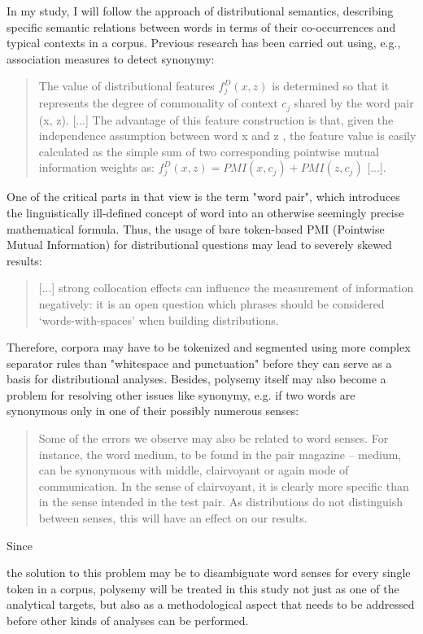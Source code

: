 \documentclass[jou]{apa6} %
\begin{document}
In my study, I will follow the approach of distributional semantics, describing specific semantic relations between words in terms of their co-occurrences and typical contexts in a corpus. Previous research has been carried out using, e.g., association measures to detect synonymy:
\blockquote[{\cite[p.~566]{hagiwaraSupervisedSynonymAcquisition2009}}]{The value of distributional features \( f_j^D (x, z) \) is determined so that it represents the degree of commonality of context \( c_j \) shared by the word pair (x, z). [...] The advantage of this feature construction is that, given the independence assumption between word x and z , the feature value is easily calculated as the simple sum of two corresponding pointwise mutual information weights as: \( f_j^D (x, z) = PMI(x, c_j) + PMI(z, c_j) \) [...].}
One of the critical parts in that view is the term "word pair", which introduces the linguistically ill-defined concept of word into an otherwise seemingly precise mathematical formula. Thus, the usage of bare token-based PMI (Pointwise Mutual Information) for distributional questions may lead to severely skewed results:
\blockquote[{\cite[p.~444]{herbelotMeasuringSemanticContent2013}}]{[...] strong collocation effects can influence the measurement of information negatively: it is an open question which phrases should be considered ‘words-with-spaces’ when building distributions.}
Therefore, corpora may have to be tokenized and segmented using more complex separator rules than "whitespace and punctuation" before they can serve as a basis for distributional analyses. Besides, polysemy itself may also become a problem for resolving other issues like synonymy, e.g. if two words are synonymous only in one of their possibly numerous senses:
\blockquote[{\cite[p.~444]{herbelotMeasuringSemanticContent2013}}]{Some of the errors we observe may also be related to word senses. For instance, the word medium, to be found in the pair magazine – medium, can be synonymous with middle, clairvoyant or again mode of communication. In the sense of clairvoyant, it is clearly more specific than in the sense intended in the test pair. As distributions do not distinguish between senses, this will have an effect on our results.}
\hypertarget{polysemyProblemForSemanticRelations}{Since} the solution to this problem may be to disambiguate word senses for every single token in a corpus, polysemy will be treated in this study not just as one of the analytical targets, but also as a methodological aspect that needs to be addressed before other kinds of analyses can be performed. 
\end{document}
